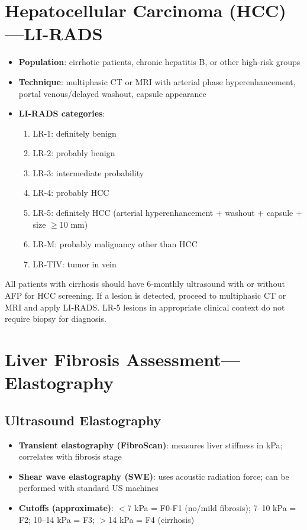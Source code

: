 \section{Hepatocellular Carcinoma (HCC)---LI-RADS}

\begin{itemize}
  \item \textbf{Population}: cirrhotic patients, chronic hepatitis B, or other high-risk groups
  \item \textbf{Technique}: multiphasic CT or MRI with arterial phase hyperenhancement, portal venous/delayed washout, capsule appearance
  \item \textbf{LI-RADS categories}:
    \begin{enumerate}
      \item LR-1: definitely benign
      \item LR-2: probably benign
      \item LR-3: intermediate probability
      \item LR-4: probably HCC
      \item LR-5: definitely HCC (arterial hyperenhancement + washout + capsule + size $\geq$10 mm)
      \item LR-M: probably malignancy other than HCC
      \item LR-TIV: tumor in vein
    \end{enumerate}
\end{itemize}

\begin{pearlbox}
All patients with cirrhosis should have 6-monthly ultrasound with or without AFP for HCC screening. If a lesion is detected, proceed to multiphasic CT or MRI and apply LI-RADS. LR-5 lesions in appropriate clinical context do not require biopsy for diagnosis.
\end{pearlbox}

\section{Liver Fibrosis Assessment---Elastography}

\subsection{Ultrasound Elastography}
\begin{itemize}
  \item \textbf{Transient elastography (FibroScan)}: measures liver stiffness in kPa; correlates with fibrosis stage
  \item \textbf{Shear wave elastography (SWE)}: uses acoustic radiation force; can be performed with standard US machines
  \item \textbf{Cutoffs (approximate)}: $<$7 kPa = F0-F1 (no/mild fibrosis); 7--10 kPa = F2; 10--14 kPa = F3; $>$14 kPa = F4 (cirrhosis)
\end{itemize}

